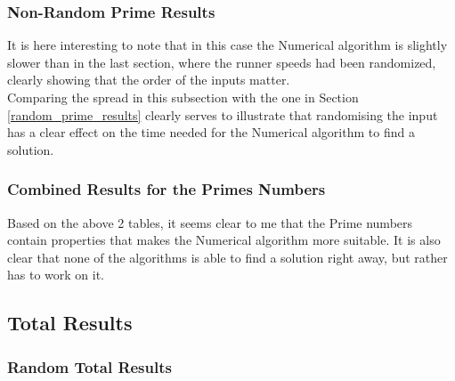 

\subsubsection{Non-Random Prime Results}



It is here interesting to note that in this case the Numerical algorithm is slightly slower than in the last section, where the runner speeds had been randomized, clearly showing that the order of the inputs matter.\\



Comparing the spread in this subsection with the one in Section \ref{random_prime_results} clearly serves to illustrate that randomising the input has a clear effect on the time needed for the Numerical algorithm to find a solution.

\subsubsection{Combined Results for the Primes Numbers} 





Based on the above 2 tables, it seems clear to me that the Prime numbers contain properties that makes the Numerical algorithm more suitable. It is also clear that none of the algorithms is able to find a solution right away, but rather has to work on it. 





\subsection{Total Results}
\subsubsection{Random Total Results}





